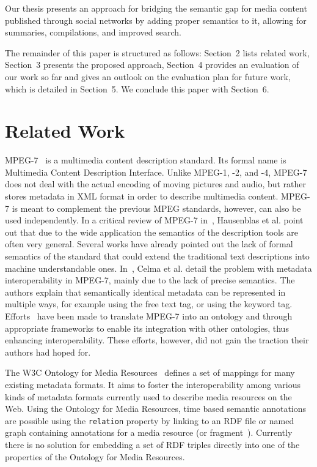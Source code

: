\documentclass[runningheads,a4paper]{llncs}
\begin{document}
Our thesis presents an approach for bridging the semantic gap for media content published through social networks by adding proper semantics to it, allowing for summaries, compilations, and improved search. 

The remainder of this paper is structured as follows: Section~2 lists related work, Section~3 presents the proposed approach, Section~4 provides an evaluation of our work so far and gives an outlook on the evaluation plan for future work, which is detailed in Section~5. We conclude this paper with Section~6.

\section{Related Work}
MPEG-7~\cite{mpeg7} is a multimedia content description standard. Its formal name is Multimedia Content Description Interface. Unlike MPEG-1, -2, and -4, MPEG-7 does not deal with the actual encoding of moving pictures and audio, but rather stores metadata in XML format in order to describe multimedia content. MPEG-7 is meant to complement the previous MPEG standards, however, can also be used independently. In a critical review of MPEG-7 in~\cite{Hau07}, Hausenblas et al. point out that due to the wide application the semantics of the description tools are often very general. Several works have already pointed out the lack of formal semantics of the standard that could extend the traditional text descriptions into machine understandable ones. In~\cite{Celma2007}, Celma et al. detail the problem with metadata interoperability in MPEG-7, mainly due to the lack of precise semantics. The authors explain that semantically identical metadata can be represented in multiple ways, for example using the free text tag, or using the keyword tag. Efforts~\cite{garca_semantic_2005-1} have been made to translate MPEG-7 into an ontology and through appropriate frameworks to enable its integration with other ontologies, thus enhancing interoperability. These efforts, however, did not gain the traction their authors had hoped for.

The W3C Ontology for Media Resources~\cite{mediaontology} defines a set of mappings for many existing metadata formats. It aims to foster the interoperability among various kinds of metadata formats currently used to describe media resources on the Web. Using the Ontology for Media Resources, time based semantic annotations are possible using the \texttt{relation} property by linking to an RDF file or named graph containing annotations for a media resource (or fragment~\cite{W3C:MediaFrags}). Currently there is no solution for embedding a set of RDF triples directly into one of the properties of the Ontology for Media Resources.
\end{document}
